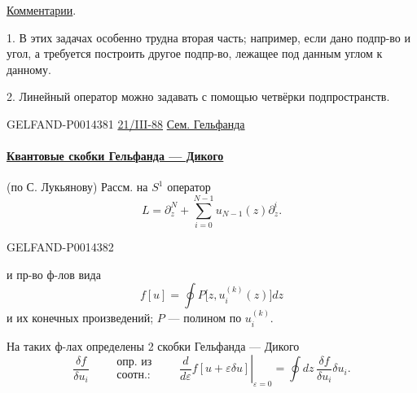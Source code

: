 \uline{Комментарии}.

1. В этих задачах особенно трудна вторая часть; например, если дано подпр-во и угол, а требуется построить другое подпр-во, лежащее под данным углом к данному.

2. Линейный оператор можно задавать с помощью четвёрки подпространств.


\begin{GelfandAdjacentEvidence}{GELFAND-P001438}{1}
\uline{21/III-88} \qquad \uline{Сем. Гельфанда}


\paragraph*{\uline{Квантовые скобки Гельфанда — Дикого}}
(по С. Лукьянову) \qquad Рассм. на \(S^1\) оператор
\begin{equation*}
L=\partial_z^N+\sum_{i=0}^{N-1}u_{N-1}(z)\partial_z^i . \tag{1}
\end{equation*}
\end{GelfandAdjacentEvidence}
\begin{GelfandAdjacentEvidence}{GELFAND-P001438}{2}


и пр-во ф-лов вида
\begin{equation*}
f[u]=\oint P\bigl[z,u_i^{(k)}(z)\bigr]dz \tag{2}
\end{equation*}
и их конечных произведений; \(P\) — полином по \(u_i^{(k)}\).

На таких ф-лах определены 2 скобки Гельфанда — Дикого
\begin{equation*}
\frac{\delta f}{\delta u_i}\qquad
\begin{gathered}\text{опр. из}\\\text{соотн.:}\end{gathered}
\qquad\left.\frac{d}{d\varepsilon}f[u+\varepsilon\delta u]\right|_{\varepsilon=0}
=\oint dz\,\frac{\delta f}{\delta u_i}\delta u_i . \tag{3}
\end{equation*}
\end{GelfandAdjacentEvidence}
